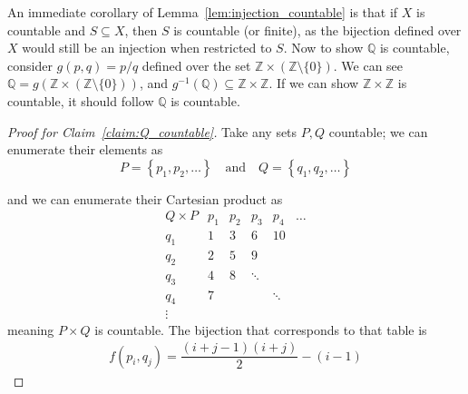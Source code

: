 \documentclass{article}
\newcommand{\Q}{\mathbb{Q}}
\newcommand{\Z}{\mathbb{Z}}
\theoremstyle{definition}
\begin{document}
An immediate corollary of Lemma~\ref{lem:injection_countable} is that if $X$ is countable and $S \subseteq X$, then $S$ is countable (or finite), as the bijection defined over $X$ would still be an injection when restricted to $S$. Now to show $\Q$ is countable, consider $g(p, q) = p / q$ defined over the set $\Z \times (\Z \setminus \{0\})$. We can see $\Q = g(\Z \times (\Z \setminus \{0\}))$, and $g^{-1}(\Q) \subseteq \Z \times \Z$. If we can show $\Z \times \Z$ is countable, it should follow $\Q$ is countable.

\begin{proof}[Proof for Claim~\ref{claim:Q_countable}]
    Take any sets $P, Q$ countable; we can enumerate their elements as
  \begin{equation*}
    P = \left\{ p_1, p_2, \ldots \right\}
    \quad
    \text{and}
    \quad
    Q = \left\{ q_1, q_2, \ldots \right\}
  \end{equation*}

  and we can enumerate their Cartesian product as
  \begin{equation*}
      \begin{matrix}
      Q \times P & p_1 & p_2 & p_3    & p_4    & \ldots \\
      q_1        & 1   & 3   & 6      & 10     &        \\
      q_2        & 2   & 5   & 9      &        &        \\
      q_3        & 4   & 8   & \ddots &        &        \\
      q_4        & 7   &     &        & \ddots &        \\
      \vdots
    \end{matrix}
  \end{equation*}
  meaning $P \times Q$ is countable. The bijection that corresponds to that table is
  \begin{align*}
    f(p_i, q_j) = \dfrac{(i + j - 1)(i + j)}{2} - (i - 1)
  \end{align*}
\end{proof}
\end{document}
